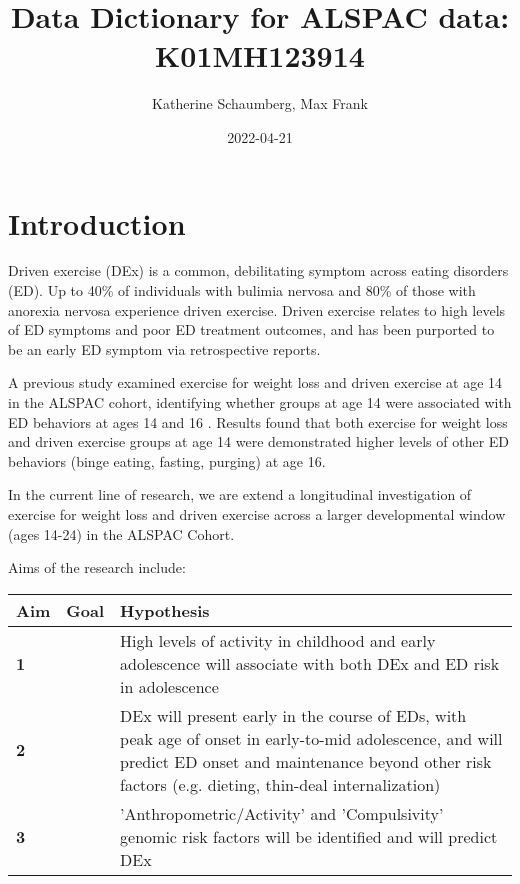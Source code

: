 \documentclass[
]{book}
\title{Data Dictionary for ALSPAC data: K01MH123914}
\author{Katherine Schaumberg, Max Frank}
\date{2022-04-21}
\begin{document}
\maketitle

{
\setcounter{tocdepth}{1}
\tableofcontents
}
\hypertarget{introduction}{%
\chapter{Introduction}\label{introduction}}

Driven exercise (DEx) is a common, debilitating symptom across eating disorders (ED). Up to 40\% of individuals with bulimia nervosa and 80\% of those with anorexia nervosa experience driven exercise. Driven exercise relates to high levels of ED symptoms and poor ED treatment outcomes, and has been purported to be an early ED symptom via retrospective reports.

A previous study examined exercise for weight loss and driven exercise at age 14 in the ALSPAC cohort, identifying whether groups at age 14 were associated with ED behaviors at ages 14 and 16 \citep{schaumberg2022}. Results found that both exercise for weight loss and driven exercise groups at age 14 were demonstrated higher levels of other ED behaviors (binge eating, fasting, purging) at age 16.

In the current line of research, we are extend a longitudinal investigation of exercise for weight loss and driven exercise across a larger developmental window (ages 14-24) in the ALSPAC Cohort.

Aims of the research include:

\begin{table}
\centering
\begin{tabular}{>{}l||>{}l|l}
\hline
Aim & Goal & Hypothesis\\
\hline
\textbf{1} & \cellcolor{gray}{\textcolor{white}{Identify and characterize the physical activity trajectories from late childhood through emerging adulthood in ALSPAC and capture associations with driven exercise and eating disorder risk.}} & High levels of activity in childhood and early adolescence will associate with both DEx and ED risk in adolescence\\
\hline
\textbf{2} & \cellcolor{gray}{\textcolor{white}{Determine the strength of DEx as a predictor of eating disorder pathology}} & DEx will present early in the course of EDs, with peak age of onset in early-to-mid adolescence, and will predict ED onset and maintenance beyond other risk factors (e.g. dieting, thin-deal internalization)\\
\hline
\textbf{3} & \cellcolor{gray}{\textcolor{white}{Demonstrate the influence of genomic risk factors on DEx}} & 'Anthropometric/Activity' and 'Compulsivity' genomic risk factors will be identified and will predict DEx\\
\hline
\end{tabular}
\end{table}
\end{document}
